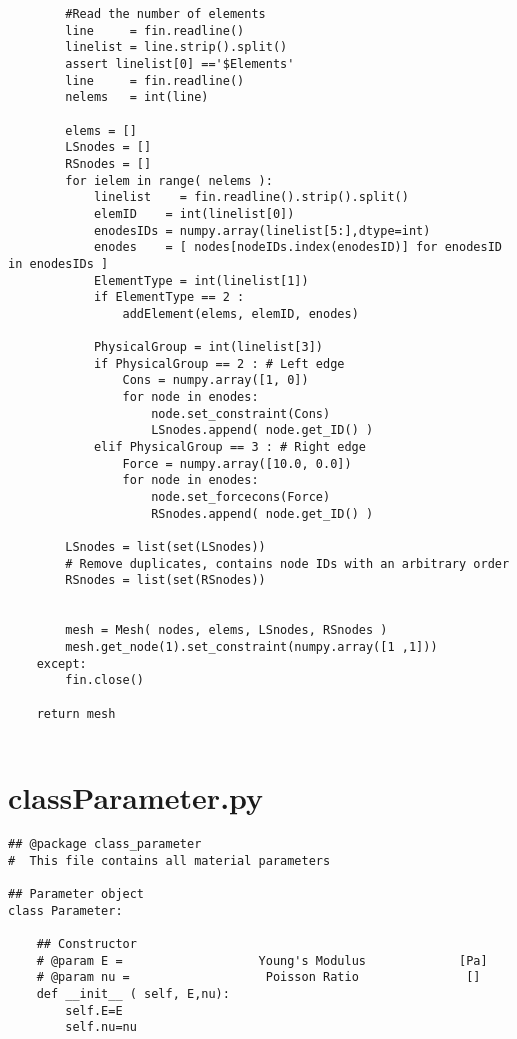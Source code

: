 \begin{appendices}
\begin{verbatim}
        #Read the number of elements
        line     = fin.readline()
        linelist = line.strip().split()
        assert linelist[0] =='$Elements'
        line     = fin.readline()
        nelems   = int(line)
        
        elems = []  
        LSnodes = []
        RSnodes = []
        for ielem in range( nelems ):
            linelist    = fin.readline().strip().split()
            elemID    = int(linelist[0])    
            enodesIDs = numpy.array(linelist[5:],dtype=int)
            enodes    = [ nodes[nodeIDs.index(enodesID)] for enodesID in enodesIDs ]
            ElementType = int(linelist[1])
            if ElementType == 2 :
                addElement(elems, elemID, enodes)
                
            PhysicalGroup = int(linelist[3])    
            if PhysicalGroup == 2 : # Left edge
                Cons = numpy.array([1, 0])
                for node in enodes:
                    node.set_constraint(Cons)
                    LSnodes.append( node.get_ID() )
            elif PhysicalGroup == 3 : # Right edge
                Force = numpy.array([10.0, 0.0])
                for node in enodes:
                    node.set_forcecons(Force)
                    RSnodes.append( node.get_ID() )
        
        LSnodes = list(set(LSnodes)) 
        # Remove duplicates, contains node IDs with an arbitrary order
        RSnodes = list(set(RSnodes))
        
        
        mesh = Mesh( nodes, elems, LSnodes, RSnodes )
        mesh.get_node(1).set_constraint(numpy.array([1 ,1]))
    except:
        fin.close()

    return mesh


\end{verbatim}

\section{classParameter.py}
\begin{verbatim}
## @package class_parameter
#  This file contains all material parameters

## Parameter object
class Parameter:

    ## Constructor
    # @param E =                   Young's Modulus             [Pa]
    # @param nu =                   Poisson Ratio               []
    def __init__ ( self, E,nu):
        self.E=E
        self.nu=nu


\end{verbatim}
\end{appendices}
